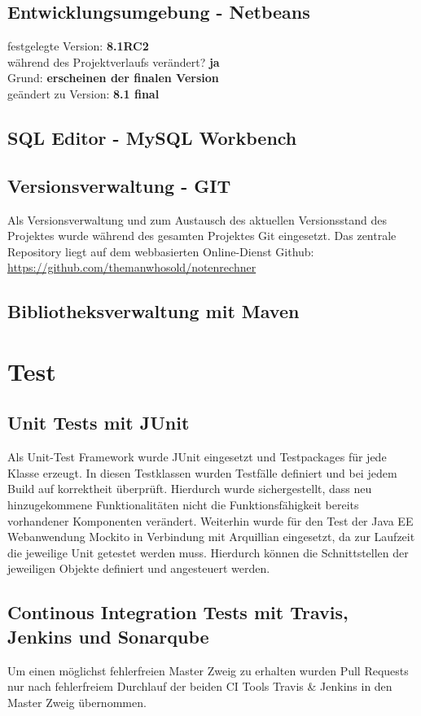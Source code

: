 \documentclass[12pt,a4paper,parskip]{scrreprt}
\begin{document}
\subsection{Entwicklungsumgebung - Netbeans}
festgelegte Version: \textbf{8.1RC2}\\
während des Projektverlaufs verändert? \textbf{ja}\\
Grund: \textbf{erscheinen der finalen Version} \\
geändert zu Version: \textbf{8.1 final}\\

\subsection{SQL Editor - MySQL Workbench}
\subsection{Versionsverwaltung - GIT}
Als Versionsverwaltung und zum Austausch des aktuellen Versionsstand des Projektes wurde während des gesamten Projektes Git eingesetzt. Das zentrale Repository liegt auf dem webbasierten Online-Dienst Github:
\url{https://github.com/themanwhosold/notenrechner}
\subsection{Bibliotheksverwaltung mit Maven}
\section{Test}
\subsection{Unit Tests mit JUnit}
Als Unit-Test Framework wurde JUnit eingesetzt und Testpackages für jede Klasse erzeugt. In diesen Testklassen wurden Testfälle definiert und bei jedem Build auf korrektheit überprüft. Hierdurch wurde sichergestellt, dass neu hinzugekommene Funktionalitäten nicht die Funktionsfähigkeit bereits vorhandener Komponenten verändert.
Weiterhin wurde für den Test der Java EE Webanwendung Mockito in Verbindung mit Arquillian eingesetzt, da zur Laufzeit die jeweilige Unit getestet werden muss. Hierdurch können die Schnittstellen der jeweiligen Objekte definiert und angesteuert werden.
\subsection{Continous Integration Tests mit Travis, Jenkins und Sonarqube}
Um einen möglichst fehlerfreien Master Zweig zu erhalten wurden Pull Requests nur nach fehlerfreiem Durchlauf der beiden CI Tools Travis \& Jenkins in den Master Zweig übernommen.
\end{document}

